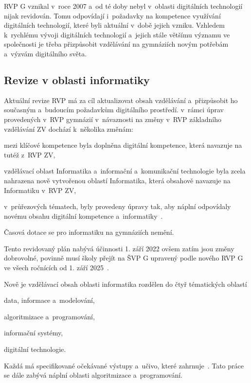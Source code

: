 \documentclass[
  digital,     %
  oneside,     %
  nosansbold,  %
  colorbold, %
  lof,         %
  nolot,         %
]{fithesis4}
\begin{document}
RVP G vznikal v~roce 2007 a~od té doby nebyl v~oblasti digitálních technologií nijak revidován. Tomu odpovídají i~požadavky na kompetence využívání digitálních technologií, které byli aktuální v~době jejich vzniku. Vzhledem k~rychlému vývoji digitálních technologií a~jejich stále většímu významu ve společnosti je třeba přizpůsobit vzdělávání na gymnáziích novým potřebám a~výzvám digitálního světa. 

\subsection{Revize v oblasti informatiky}
Aktuální revize RVP má za cíl aktualizovat obsah vzdělávání a~přizpůsobit ho současným a~budoucím požadavkům digitálního prostředí. v~rámci úprav provedených v~RVP gymnázií v~návaznosti na změny v~RVP základního vzdělávání ZV dochází k~několika změnám:
\vspace{0,1cm}
\begin{compactitem}
    \item mezi klíčové kompetence byla doplněna digitální kompetence, která navazuje na tutéž z~RVP ZV,
    \item  vzdělávací oblast Informatika a~informační a~komunikační technologie byla zcela nahrazena nově vytvořenou oblastí Informatika, která obsahově navazuje na Informatiku v~RVP ZV,
    \item v~průřezových tématech, byly provedeny úpravy tak, aby náplní odpovídaly novému obsahu digitální kompetence a~informatiky~\cite{revizeEdu}.
\end{compactitem}
\vspace{0,1cm}
Časová dotace se pro informatiku na gymnáziích nemění.

Tento revidovaný plán nabývá účinnosti 1. září 2022 ovšem zatím jsou změny dobrovolné, povinně musí školy přejít na ŠVP G upravený podle nového RVP G ve všech ročnících od 1. září 2025~\cite{revizeEdu}.

Nově je vzdělávací obsah oblasti informatika rozdělen do čtyř tématických oblastí
\vspace{0,1cm}
\begin{compactitem}
    \item data, informace a~modelování,
    \item algoritmizace a~programování,
    \item informační systémy,
    \item digitální technologie.
\end{compactitem}
\vspace{0,1cm}
Každá má specifikované očekávané výstupy a~učivo, které zahrnuje~\cite{RVPG}. Tato práce se dále zabývá náplní oblasti algoritmizace a~programování.
\end{document}
